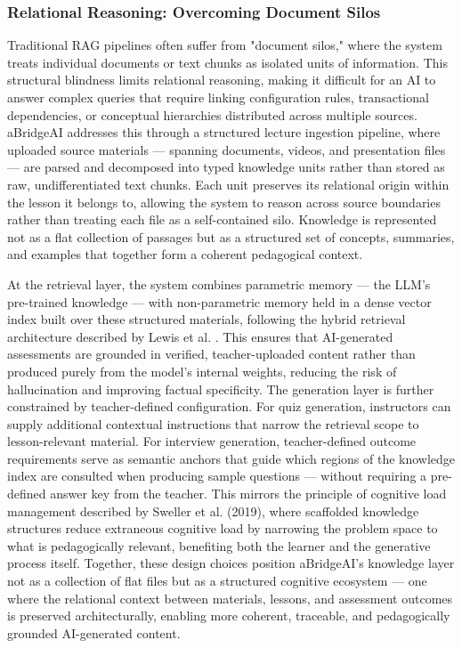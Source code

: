 \subsubsection{Relational Reasoning: Overcoming Document Silos}
Traditional RAG pipelines often suffer from "document silos," where the system treats individual documents or text chunks as isolated units of information. This structural blindness limits relational reasoning, making it difficult for an AI to answer complex queries that require linking configuration rules, transactional dependencies, or conceptual hierarchies distributed across multiple sources\cite{lewis2020retrieval}. aBridgeAI addresses this through a structured lecture ingestion pipeline, where uploaded source materials — spanning documents, videos, and presentation files — are parsed and decomposed into typed knowledge units rather than stored as raw, undifferentiated text chunks. Each unit preserves its relational origin within the lesson it belongs to, allowing the system to reason across source boundaries rather than treating each file as a self-contained silo. Knowledge is represented not as a flat collection of passages but as a structured set of concepts, summaries, and examples that together form a coherent pedagogical context.

At the retrieval layer, the system combines parametric memory — the LLM's pre-trained knowledge — with non-parametric memory held in a dense vector index built over these structured materials, following the hybrid retrieval architecture described by Lewis et al. \cite{lewis2020retrieval}. This ensures that AI-generated assessments are grounded in verified, teacher-uploaded content rather than produced purely from the model's internal weights, reducing the risk of hallucination and improving factual specificity. The generation layer is further constrained by teacher-defined configuration. For quiz generation, instructors can supply additional contextual instructions that narrow the retrieval scope to lesson-relevant material. For interview generation, teacher-defined outcome requirements serve as semantic anchors that guide which regions of the knowledge index are consulted when producing sample questions — without requiring a pre-defined answer key from the teacher. This mirrors the principle of cognitive load management described by Sweller et al. (2019)\cite{Cog2019Sweller}, where scaffolded knowledge structures reduce extraneous cognitive load by narrowing the problem space to what is pedagogically relevant, benefiting both the learner and the generative process itself.
Together, these design choices position aBridgeAI's knowledge layer not as a collection of flat files but as a structured cognitive ecosystem — one where the relational context between materials, lessons, and assessment outcomes is preserved architecturally, enabling more coherent, traceable, and pedagogically grounded AI-generated content\cite{rag2025}.

